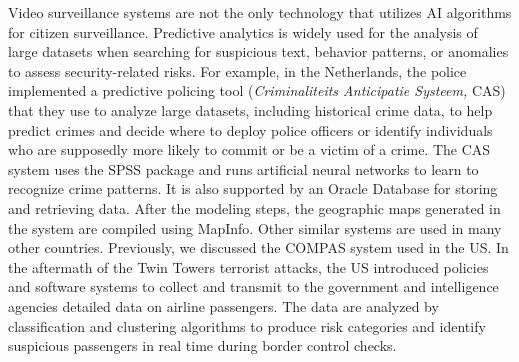 Video surveillance systems are not the only technology that utilizes AI algorithms for citizen surveillance. Predictive analytics is widely used for the analysis of large datasets when searching for suspicious text, behavior patterns, or anomalies to assess security-related risks. For example, in the Netherlands, the police implemented a predictive policing tool (\textit{Criminaliteits Anticipatie Systeem, }CAS) that they use to analyze large datasets, including historical crime data, to help predict crimes and decide where to deploy police officers or identify individuals who are supposedly more likely to commit or be a victim of a crime. The CAS system uses the SPSS package and runs artificial neural networks to learn to recognize crime patterns. It is also supported by an Oracle Database for storing and retrieving data. After the modeling steps, the geographic maps generated in the system are compiled using MapInfo. Other similar systems are used in many other countries. Previously, we discussed the COMPAS system used in the US. In the aftermath of the Twin Towers terrorist attacks, the US introduced policies and software systems to collect and transmit to the government and intelligence agencies detailed data on airline passengers. The data are analyzed by classification and clustering algorithms to produce risk categories and identify suspicious passengers in real time during border control checks.

